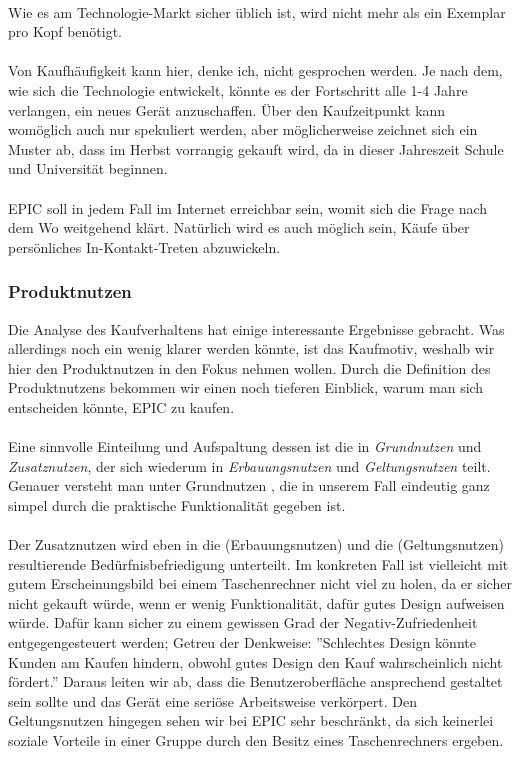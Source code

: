 \\
Wie es am Technologie-Markt sicher üblich ist, wird nicht mehr als ein Exemplar pro Kopf benötigt.\\
\\
Von Kaufhäufigkeit kann hier, denke ich, nicht gesprochen werden. Je nach dem, wie sich die Technologie entwickelt, könnte es der Fortschritt alle 1-4 Jahre verlangen, ein neues Gerät anzuschaffen. Über den Kaufzeitpunkt kann womöglich auch nur spekuliert werden, aber möglicherweise zeichnet sich ein Muster ab, dass im Herbst vorrangig gekauft wird, da in dieser Jahreszeit Schule und Universität beginnen.\\
\\
EPIC soll in jedem Fall im Internet erreichbar sein, womit sich die Frage nach dem Wo weitgehend klärt. Natürlich wird es auch möglich sein, Käufe über persönliches In-Kontakt-Treten abzuwickeln.\\

\subsubsection{Produktnutzen}
Die Analyse des Kaufverhaltens hat einige interessante Ergebnisse gebracht. Was allerdings noch ein wenig klarer werden könnte, ist das Kaufmotiv, weshalb wir hier den Produktnutzen in den Fokus nehmen wollen. Durch die Definition des Produktnutzens bekommen wir einen noch tieferen Einblick, warum man sich entscheiden könnte, EPIC zu kaufen.\\
\\
Eine sinnvolle Einteilung und Aufspaltung dessen ist die in \textit{Grundnutzen} und \textit{Zusatznutzen}, der sich wiederum in \textit{Erbauungsnutzen} und \textit{Geltungsnutzen} teilt. Genauer versteht man unter Grundnutzen , die in unserem Fall eindeutig ganz simpel durch die praktische Funktionalität gegeben ist.\\
\\
Der Zusatznutzen wird eben in die  (Erbauungsnutzen) und die  (Geltungsnutzen) resultierende Bedürfnisbefriedigung unterteilt. Im konkreten Fall ist vielleicht mit gutem Erscheinungsbild bei einem Taschenrechner nicht viel zu holen, da er sicher nicht gekauft würde, wenn er wenig Funktionalität, dafür gutes Design aufweisen würde. Dafür kann sicher zu einem gewissen Grad der Negativ-Zufriedenheit entgegengesteuert werden; Getreu der Denkweise: ''Schlechtes Design könnte Kunden am Kaufen hindern, obwohl gutes Design den Kauf wahrscheinlich nicht fördert.'' Daraus leiten wir ab, dass die Benutzeroberfläche ansprechend gestaltet sein sollte und das Gerät eine seriöse Arbeitsweise verkörpert. Den Geltungsnutzen hingegen sehen wir bei EPIC sehr beschränkt, da sich keinerlei soziale Vorteile in einer Gruppe durch den Besitz eines Taschenrechners ergeben.\\

